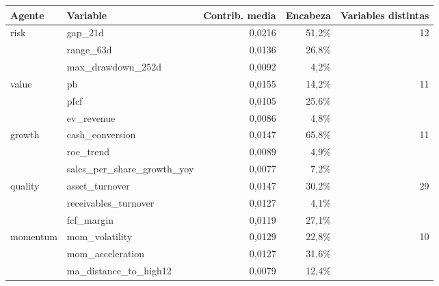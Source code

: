 \begin{tabular}{llrrr}
\toprule
Agente & Variable & Contrib. media & Encabeza & Variables distintas \\
\midrule
risk & gap\_21d & 0,0216 & 51,2\% & 12 \\
 & range\_63d & 0,0136 & 26,8\% &  \\
 & max\_drawdown\_252d & 0,0092 & 4,2\% &  \\
value & pb & 0,0155 & 14,2\% & 11 \\
 & pfcf & 0,0105 & 25,6\% &  \\
 & ev\_revenue & 0,0086 & 4,8\% &  \\
growth & cash\_conversion & 0,0147 & 65,8\% & 11 \\
 & roe\_trend & 0,0089 & 4,9\% &  \\
 & sales\_per\_share\_growth\_yoy & 0,0077 & 7,2\% &  \\
quality & asset\_turnover & 0,0147 & 30,2\% & 29 \\
 & receivables\_turnover & 0,0127 & 4,1\% &  \\
 & fcf\_margin & 0,0119 & 27,1\% &  \\
momentum & mom\_volatility & 0,0129 & 22,8\% & 10 \\
 & mom\_acceleration & 0,0127 & 31,6\% &  \\
 & ma\_distance\_to\_high12 & 0,0079 & 12,4\% &  \\
\bottomrule
\end{tabular}

